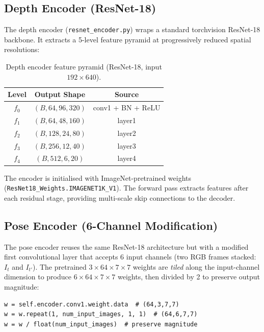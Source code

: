 \documentclass[10pt, a4paper, twocolumn]{article}
\begin{document}
\subsection{Depth Encoder (ResNet-18)}

The depth encoder (\texttt{resnet\_encoder.py}) wraps a standard torchvision ResNet-18 backbone. It extracts a 5-level feature pyramid at progressively reduced spatial resolutions:

\begin{table}[H]
\centering
\caption{Depth encoder feature pyramid (ResNet-18, input $192\times640$).}
\label{tab:encoder_feat}
\begin{tabular}{@{}ccc@{}}
\toprule
\textbf{Level} & \textbf{Output Shape} & \textbf{Source} \\
\midrule
$f_0$ & $(B, 64, 96, 320)$ & conv1 + BN + ReLU \\
$f_1$ & $(B, 64, 48, 160)$ & layer1 \\
$f_2$ & $(B, 128, 24, 80)$ & layer2 \\
$f_3$ & $(B, 256, 12, 40)$ & layer3 \\
$f_4$ & $(B, 512, 6, 20)$ & layer4 \\
\bottomrule
\end{tabular}
\end{table}

The encoder is initialised with ImageNet-pretrained weights (\texttt{ResNet18\_Weights.IMAGENET1K\_V1}). The forward pass extracts features after each residual stage, providing multi-scale skip connections to the decoder.

\subsection{Pose Encoder (6-Channel Modification)}

The pose encoder reuses the same ResNet-18 architecture but with a modified first convolutional layer that accepts 6 input channels (two RGB frames stacked: $I_t$ and $I_{t'}$). The pretrained $3 \times 64 \times 7 \times 7$ weights are \emph{tiled} along the input-channel dimension to produce $6 \times 64 \times 7 \times 7$ weights, then divided by 2 to preserve output magnitude:

\begin{lstlisting}[caption={Pose encoder weight initialisation.}]
w = self.encoder.conv1.weight.data  # (64,3,7,7)
w = w.repeat(1, num_input_images, 1, 1)  # (64,6,7,7)
w = w / float(num_input_images)  # preserve magnitude
\end{lstlisting}
\end{document}
